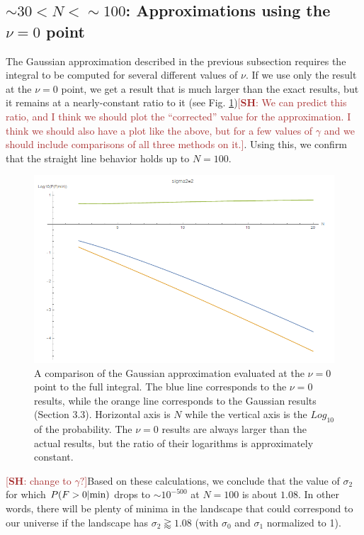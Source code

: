 \documentclass[12pt]{article}
\newcommand{\SH}[1]{\textcolor{brown}{[{\bf SH}: #1]}}
\begin{document}
\subsection{$\sim 30 < N < \sim100$: Approximations using the $\nu=0$ point}

The Gaussian approximation described in the previous subsection requires the integral to be computed for several different values of $\nu$. If we use only the result at the $\nu=0$ point, we get a result that is much larger than the exact results, but it remains at a nearly-constant ratio to it (see Fig. \ref{sigma2=2v=0})\SH{We can predict this ratio, and I think we should plot the ``corrected'' value for the approximation. I think we should also have a plot like the above, but for a few values of $\gamma$ and we should include comparisons of all three methods on it.}. Using this, we confirm that the straight line behavior holds up to $N = 100$.

\begin{figure} 
  \centering
  \includegraphics[width=\linewidth]{sigma2=2v=0.png}
  \caption{A comparison of the Gaussian approximation evaluated at the $\nu=0$ point to the full integral. The blue line corresponds to the $\nu=0$ results, while the orange line corresponds to the Gaussian results (Section 3.3). Horizontal axis is $N$ while the vertical axis is the $Log_{10}$ of the probability. The $\nu=0$ results are always larger than the actual results, but the ratio of their logarithms is approximately constant.}
  \label{sigma2=2v=0}
\end{figure}

\SH{change to $\gamma?$}Based on these calculations, we conclude that the value of $\sigma_2$ for which $P(F>0|{\rm min})$ drops to $\sim 10^{-500}$ at $N = 100$ is about $1.08$. In other words, there will be plenty of minima in the landscape that could correspond to our universe if the landscape has $\sigma_2 \gtrapprox 1.08$ (with $\sigma_0$ and $\sigma_1$ normalized to 1).
\end{document}
